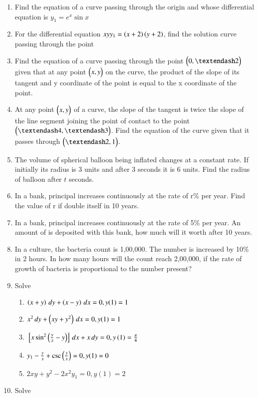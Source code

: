 \begin{enumerate}[label=\arabic*.,ref=\thesubsection.\theenumi]
\begin{enumerate}[label = (\roman*)]
\end{enumerate}
%
\item Find the equation of a curve passing through the origin and whose differential equation is $y_1 = e^x \sin x$
%
\item For the differential equation $xy y_1 = \left(x+2\right)\left(y+2\right)$, find the solution curve passing through the point 
%
\item Find the equation of a curve passing through the point $\myvec{0, –2}$ given that at any point $\begin{pmatrix}x, y\end{pmatrix}$ on the curve, the product of the slope of its tangent and y coordinate of the point is equal to the x coordinate of the point.
\item At any point $\begin{pmatrix}x, y\end{pmatrix}$ of a curve, the slope of the tangent is twice the slope of the line segment joining the point of contact to the point $\myvec{– 4, –3}$. Find the equation of the curve given that it passes through $\myvec{–2, 1}$.
\item The volume of spherical balloon being inflated changes at a constant rate. If initially its radius is 3 units and after 3 seconds it is 6 units. Find the radius of balloon after $t$ seconds.
\item In a bank, principal increases continuously at the rate of r\% per year. Find the value of r if  double itself in 10 years. 
\item In a bank, principal increases continuously at the rate of 5\% per year. An amount of  is deposited with this bank, how much will it worth after 10 years.
\item In a culture, the bacteria count is 1,00,000. The number is increased by 10\% in 2 hours. In how many hours will the count reach 2,00,000, if the rate of growth of bacteria is proportional to the number present?
\item Solve
\begin{enumerate}[label=(\roman*)]
%
\item  $\left(x+y\right)\, dy + \left(x-y\right)\, dx = 0, y(1) = 1$
\item  $x^2\, dy + \left(xy+y^2\right)\, dx = 0, y(1) = 1$
\item  ${}\left[x\sin^2\left(\frac{y}{x}-y\right)\right]\, dx + x\, dy = 0, y\left(1\right) = \frac{\pi}{4}$
\item  $y_1 - \frac{y}{x} + \csc \left(\frac{y}{x}\right) = 0, y(1) = 0$
\item  $2xy+y^2-2x^2y_1  = 0, y(1) = 2$
\end{enumerate}
\item Solve

\end{enumerate}
